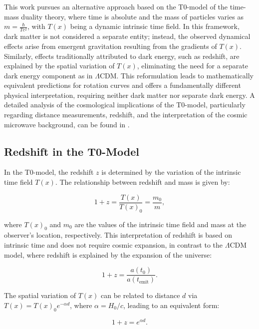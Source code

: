 \documentclass[a4paper,12pt]{article}
\newcommand{\Tfield}{T(x)}
\begin{document}
	This work pursues an alternative approach based on the T0-model of the time-mass duality theory, where time is absolute and the mass of particles varies as \( m = \frac{\hbar}{T c^2} \), with \( \Tfield \) being a dynamic intrinsic time field. In this framework, dark matter is not considered a separate entity; instead, the observed dynamical effects arise from emergent gravitation resulting from the gradients of \( \Tfield \). Similarly, effects traditionally attributed to dark energy, such as redshift, are explained by the spatial variation of \( \Tfield \), eliminating the need for a separate dark energy component as in \(\Lambda\)CDM. This reformulation leads to mathematically equivalent predictions for rotation curves and offers a fundamentally different physical interpretation, requiring neither dark matter nor separate dark energy. A detailed analysis of the cosmological implications of the T0-model, particularly regarding distance measurements, redshift, and the interpretation of the cosmic microwave background, can be found in \cite{pascher_messdifferenzen_2025}.
	
	\subsection{Redshift in the T0-Model}
	
	In the T0-model, the redshift \( z \) is determined by the variation of the intrinsic time field \( \Tfield \). The relationship between redshift and mass is given by:
	
	\begin{equation}
		1 + z = \frac{\Tfield}{\Tfield_0} = \frac{m_0}{m},
	\end{equation}
	
	where \( \Tfield_0 \) and \( m_0 \) are the values of the intrinsic time field and mass at the observer's location, respectively. This interpretation of redshift is based on intrinsic time and does not require cosmic expansion, in contrast to the \(\Lambda\)CDM model, where redshift is explained by the expansion of the universe:
	
	\begin{equation}
		1 + z = \frac{a(t_0)}{a(t_{\text{emit}})}.
	\end{equation}
	
	The spatial variation of \( \Tfield \) can be related to distance \( d \) via \( \Tfield = \Tfield_0 e^{-\alpha d} \), where \( \alpha = H_0/c \), leading to an equivalent form:
	
	\begin{equation}
		1 + z = e^{\alpha d}.
	\end{equation}
	
\end{document}
